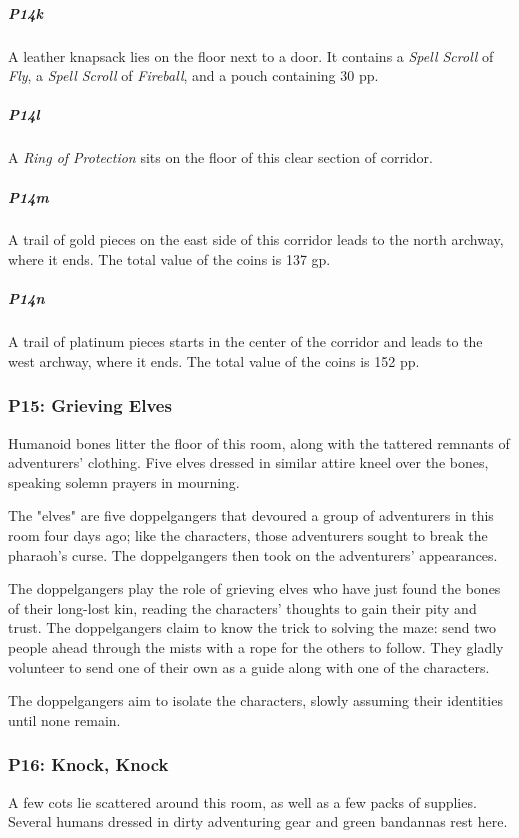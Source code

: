 \documentclass[10pt,a4paper,twoside,bg=print,twocolumn,openany,nodeprecatedcode]{dndbook}
\begin{document}
\subparagraph{P14k}
A leather knapsack lies on the floor next to a door. It contains a \textit{Spell Scroll} of \textit{Fly}, a \textit{Spell Scroll} of \textit{Fireball}, and a pouch containing 30 pp.

\subparagraph{P14l}
A \textit{Ring of Protection} sits on the floor of this clear section of corridor.

\subparagraph{P14m}
A trail of gold pieces on the east side of this corridor leads to the north archway, where it ends. The total value of the coins is 137 gp.

\subparagraph{P14n}
A trail of platinum pieces starts in the center of the corridor and leads to the west archway, where it ends. The total value of the coins is 152 pp.

\subsubsection{P15: Grieving Elves}
\begin{DndReadAloud}{}
Humanoid bones litter the floor of this room, along with the tattered remnants of adventurers' clothing. Five elves dressed in similar attire kneel over the bones, speaking solemn prayers in mourning.

\end{DndReadAloud}

The "elves" are five doppelgangers that devoured a group of adventurers in this room four days ago; like the characters, those adventurers sought to break the pharaoh's curse. The doppelgangers then took on the adventurers' appearances.

The doppelgangers play the role of grieving elves who have just found the bones of their long-lost kin, reading the characters' thoughts to gain their pity and trust. The doppelgangers claim to know the trick to solving the maze: send two people ahead through the mists with a rope for the others to follow. They gladly volunteer to send one of their own as a guide along with one of the characters.

The doppelgangers aim to isolate the characters, slowly assuming their identities until none remain.

\subsubsection{P16: Knock, Knock}
\begin{DndReadAloud}{}
A few cots lie scattered around this room, as well as a few packs of supplies. Several humans dressed in dirty adventuring gear and green bandannas rest here.

\end{DndReadAloud}
\end{document}
